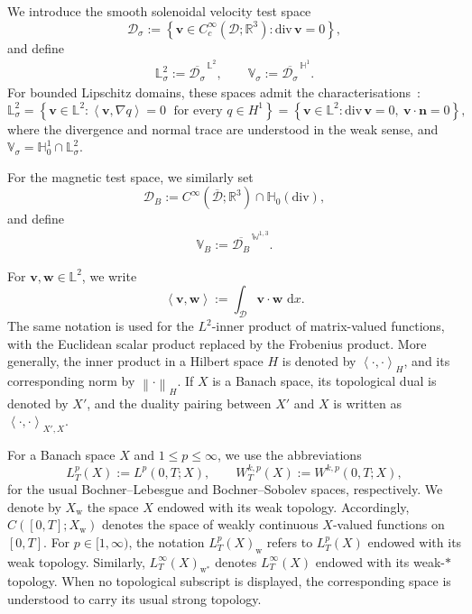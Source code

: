 \documentclass[11pt, reqno]{amsart}
\theoremstyle{definition}
\numberwithin{equation}{section}
\newcommand{\divg}{\mathrm{div}\,}
\newcommand{\bff}{\boldsymbol}
\newcommand{\bb}{\mathbb}
\newcommand{\dx}{\,\mathrm{d}x}
\newcommand{\norm}[2]{\left\|{#1}\right\|_{#2}}
\newcommand{\inpro}[2]{\left\langle#1,#2\right\rangle}
\newcommand{\hzerodiv}{\mathbb{H}_0(\mathrm{div})}
\begin{document}
We introduce the smooth solenoidal velocity test space
\[
\mathcal D_\sigma
:=
\left\{
\bff v\in C_c^\infty(\mathscr D;\bb R^3):
\divg\bff v=0
\right\},
\]
and define
\begin{align}\label{equ:V sigma}
	\bb L_\sigma^2
	:=
	\overline{\mathcal D_\sigma}^{\,\bb L^2},
	\qquad
	\bb V_\sigma
	:=
	\overline{\mathcal D_\sigma}^{\,\bb H^1}.
\end{align}
For bounded Lipschitz domains, these spaces admit the
characterisations~\cite{Tem01}:
\[
\bb L_\sigma^2
=
\left\{
\bff v\in\bb L^2:
\inpro{\bff v}{\nabla q}=0
\;\text{ for every }q\in H^1
\right\}
=
\left\{
\bff v\in\bb L^2:
\divg\bff v=0,\ 
\bff v\cdot\bff n=0
\right\},
\]
where the divergence and normal trace are understood in the weak sense, and $\bb V_\sigma= \bb H_0^1\cap\bb L_\sigma^2$.

For the magnetic test space, we similarly set
\[
\mathcal D_B
:=
C^\infty(\overline{\mathscr D};\bb R^3)
\cap\hzerodiv,
\]
and define
\begin{align}\label{equ:V B}
	\bb V_B
	:=
	\overline{\mathcal D_B}^{\,\bb W^{1,3}}.
\end{align}

For $\bff{v},\bff{w}\in\bb{L}^2$, we write
\[
\inpro{\bff{v}}{\bff{w}}
:=
\int_{\mathscr{D}}
\bff{v}\cdot\bff{w}\,\dx.
\]
The same notation is used for the $L^2$-inner product of matrix-valued
functions, with the Euclidean scalar product replaced by the Frobenius
product. More generally, the inner product in a Hilbert space $H$ is denoted
by $\inpro{\cdot}{\cdot}_H$, and its corresponding norm by
$\norm{\cdot}{H}$. If $X$ is a Banach space, its topological dual is denoted
by $X'$, and the duality pairing between $X'$ and $X$ is written as 
$\inpro{\cdot}{\cdot}_{X',X}$.

For a Banach space $X$ and $1\leq p\leq\infty$, we use the abbreviations
\[
L_T^p(X):=L^p(0,T;X),
\qquad
W_T^{k,p}(X):=W^{k,p}(0,T;X),
\]
for the usual Bochner--Lebesgue and Bochner--Sobolev spaces, respectively.
We denote by $X_{\mathrm{w}}$ the space $X$ endowed with its weak topology.
Accordingly, $C([0,T];X_{\mathrm{w}})$
denotes the space of weakly continuous $X$-valued functions on $[0,T]$.
For $p\in [1,\infty)$, the notation $L_T^p(X)_{\mathrm{w}}$
refers to $L_T^p(X)$ endowed with its weak topology. Similarly, $L_T^\infty(X)_{\mathrm{w}^\ast}$
denotes $L_T^\infty(X)$ endowed with its weak-$\ast$ topology. When no
topological subscript is displayed, the corresponding space is understood
to carry its usual strong topology.
\end{document}
